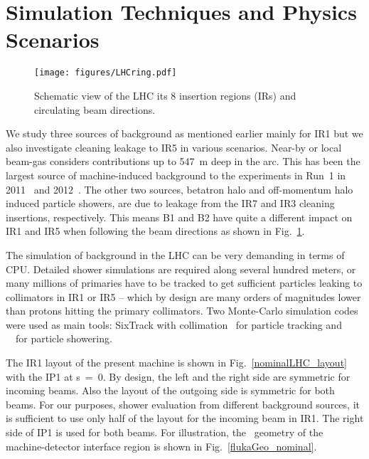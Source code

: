 \section{Simulation Techniques and Physics Scenarios\label{simSetup}}


\begin{figure}%
\begin{center}
\texttt{[image: figures/LHCring.pdf]}
\end{center}
\vspace{-0.6cm}
 \caption{Schematic view of the LHC its 8 insertion regions (IRs) and circulating beam directions.
  \label{LHCring}}
\end{figure}

We study three sources of background as mentioned earlier mainly for IR1 but we also investigate cleaning leakage to IR5 in various scenarios. Near-by or local beam-gas considers contributions up to 547~m deep in the arc. This has been the largest source of machine-induced background to the experiments in Run~1 in 2011~\cite{nimPaperRod} and 2012~\cite{atlasBKGPaper2012}. The other two sources, betatron halo and off-momentum halo induced particle showers, are due to leakage from the IR7 and IR3 cleaning insertions, respectively. This means B1 and B2 have quite a different impact on IR1 and IR5 when following the beam directions as shown in Fig.~\ref{LHCring}.

The simulation of background in the LHC can be very demanding in terms of CPU. Detailed shower simulations are required along several hundred meters, or many millions of primaries have to be tracked to get sufficient particles leaking to collimators in IR1 or IR5 -- which by design are many orders of magnitudes lower than protons hitting the primary collimators. Two Monte-Carlo simulation codes were used as main tools: SixTrack with collimation~\cite{SixTrackRef} for particle tracking and \fluka~\cite{flukaRef1,flukaRef2}~for particle showering.

The IR1 layout of the present machine is shown in Fig.~\ref{nominalLHC_layout} with the IP1 at s~=~0. By design, the left and the right side are symmetric for incoming beams. Also the layout of the outgoing side is symmetric for both beams. For our purposes, shower evaluation from different background sources, it is sufficient to use only half of the layout for the incoming beam in IR1. The right side of IP1 is used for both beams. For illustration, the \fluka~geometry of the machine-detector interface region is shown in Fig.~\ref{flukaGeo_nominal}.


